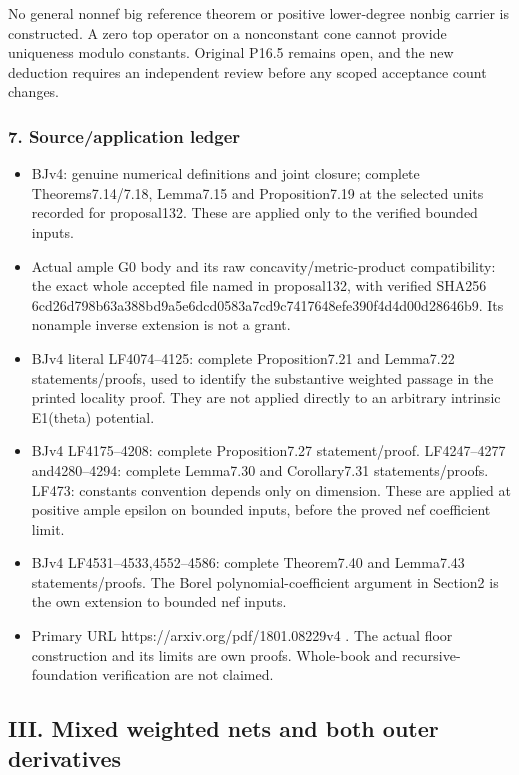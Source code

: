 \documentclass[
]{article}
\providecommand{\tightlist}{%
  \setlength{\itemsep}{0pt}\setlength{\parskip}{0pt}}
\begin{document}
No general nonnef big reference theorem or positive lower-degree nonbig
carrier is constructed. A zero top operator on a nonconstant cone cannot
provide uniqueness modulo constants. Original P16.5 remains open, and
the new deduction requires an independent review before any scoped
acceptance count changes.

\subsubsection{7. Source/application
ledger}\label{sourceapplication-ledger-1}

\begin{itemize}
\tightlist
\item
  BJv4: genuine numerical definitions and joint closure; complete
  Theorems7.14/7.18, Lemma7.15 and Proposition7.19 at the selected units
  recorded for proposal132. These are applied only to the verified
  bounded inputs.
\item
  Actual ample G0 body and its raw concavity/metric-product
  compatibility: the exact whole accepted file named in proposal132,
  with verified SHA256
  6cd26d798b63a388bd9a5e6dcd0583a7cd9c7417648efe390f4d4d00d28646b9. Its
  nonample inverse extension is not a grant.
\item
  BJv4 literal LF4074--4125: complete Proposition7.21 and Lemma7.22
  statements/proofs, used to identify the substantive weighted passage
  in the printed locality proof. They are not applied directly to an
  arbitrary intrinsic E1(theta) potential.
\item
  BJv4 LF4175--4208: complete Proposition7.27 statement/proof.
  LF4247--4277 and4280--4294: complete Lemma7.30 and Corollary7.31
  statements/proofs. LF473: constants convention depends only on
  dimension. These are applied at positive ample epsilon on bounded
  inputs, before the proved nef coefficient limit.
\item
  BJv4 LF4531--4533,4552--4586: complete Theorem7.40 and Lemma7.43
  statements/proofs. The Borel polynomial-coefficient argument in
  Section2 is the own extension to bounded nef inputs.
\item
  Primary URL https://arxiv.org/pdf/1801.08229v4 . The actual floor
  construction and its limits are own proofs. Whole-book and
  recursive-foundation verification are not claimed.
\end{itemize}

\subsection{III. Mixed weighted nets and both outer
derivatives}\label{iii.-mixed-weighted-nets-and-both-outer-derivatives}
\end{document}
